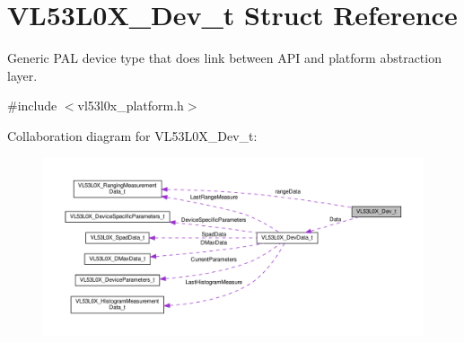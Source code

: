 \hypertarget{structVL53L0X__Dev__t}{}\section{V\+L53\+L0\+X\+\_\+\+Dev\+\_\+t Struct Reference}
\label{structVL53L0X__Dev__t}


Generic P\+AL device type that does link between A\+PI and platform abstraction layer.  




{\ttfamily \#include $<$vl53l0x\+\_\+platform.\+h$>$}



Collaboration diagram for V\+L53\+L0\+X\+\_\+\+Dev\+\_\+t\+:\nopagebreak
\begin{figure}[H]
\begin{center}
\leavevmode
\includegraphics[width=350pt]{structVL53L0X__Dev__t__coll__graph}
\end{center}
\end{figure}
